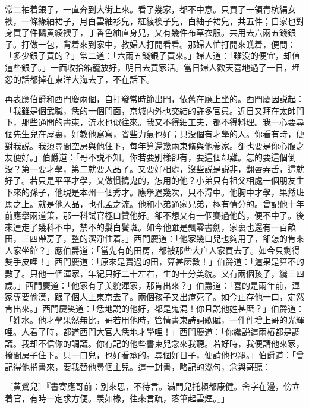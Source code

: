 常二袖着銀子，一直奔到大街上來。看了幾家，都不中意。只買了一領青杭絹女襖，一條綠紬裙子，月白雲紬衫兒，紅綾襖子兒，白紬子裙兒，共五件；自家也對身買了件鵝黄綾襖子，丁香色紬直身兒，又有幾件布草衣服。共用去六兩五錢銀子。打做一包，背着來到家中，教婦人打開看看。那婦人忙打開來瞧着，便問：「多少銀子買的？」常二道：「六兩五錢銀子買來。」婦人道：「雖没的便宜，却值這些銀子。」一面收拾箱籠放好，明日去買家活。當日婦人歡天喜地過了一日，埋怨的話都掉在東洋大海去了，不在話下。

再表應伯爵和西門慶兩個，自打發常時節出門，依舊在廳上坐的。西門慶因説起：「我雖是個武職，恁的一個門面，京城内外也交結的許多官員。近日又拜在太師門下，那些通問的書柬，流水也似往來。我又不得細工夫，都不得料理。我一心要尋個先生兒在屋裏，好教他寫寫，省些力氣也好；只没個有才學的人。你看有時，便對我説。我須尋間空房與他住下，每年算還幾兩束脩與他養家。卻也要是你心腹之友便好。」伯爵道：「哥不説不知。你若要别樣卻有，要這個却難。怎的要這個倒没？第一要才學，第二就要人品了。又要好相處，沒些説是説非，翻唇弄舌，這就好了。若只是平平才學，又做慣搗鬼的，怎用的他？小弟只有祖父相處一個朋友生下來的孫子，他現是本州一個秀才。應擧過幾次，只不淂中。他胸中才學，果然班馬之上。就是他人品，也孔孟之流。他和小弟通家兄弟，極有情分的。曾記他十年前應擧兩道策，那一科試官極口贊他好。卻不想又有一個賽過他的，便不中了。後來連走了幾科不中，禁不的髮白鬢斑。如今他雖是飄零書劍，家裏也還有一百畝田，三四帶房子，整的潔淨住着。」西門慶道：「他家幾口兒也夠用了，卻怎的肯來人家坐館？」應伯爵道：「當先有的田房，都被那些大户人家買去了。如今只剩得雙手皮哩！」西門慶道：「原來是賣過的田，算甚麽數！」伯爵道：「這果是算不的數了。只他一個渾家，年紀只好二十左右，生的十分美貌。又有兩個孩子，纔三四歲。」西門慶道：「他家有了美貌渾家，那肯出來？」伯爵道：「喜的是兩年前，渾家專要偷漢，跟了個人上東京去了。兩個孩子又出痘死了。如今止存他一口，定然肯出來。」西門慶笑道：「恁地説的他好，都是鬼混！你且説他姓甚麽？」伯爵道：「姓水。他才學果然無比，哥若用他時，管情書柬詩詞歌賦，一件件增上哥的光輝哩。人看了時，都道西門大官人恁地才學哩！」西門慶道：「你纔説這兩樁都是調謊。我却不信你的調謊。你有記的他些書柬兒念來我聽。若好時，我便請他來家，撥間房子住下。只一口兒，也好看承的。尋個好日子，便請他也罷。」伯爵道：「曾記得他捎書來，要我替他尋個主兒。這一封書，略記的幾句，念與哥聽：

\begin{myquote}
{\marktext〔黄鶯兒〕}『書寄應哥前：別來思，不待言。滿門兒托賴都康健。舍字在邊，傍立着官，有時一定求方便。羡如椽，往來言疏，落筆起雲煙。』」
\end{myquote}

